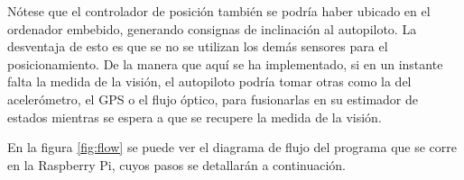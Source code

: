 Nótese que el controlador de posición también se podría haber ubicado en el ordenador embebido, generando consignas de inclinación al autopiloto. 
La desventaja de esto es que se no se utilizan los demás sensores para el posicionamiento.
De la manera que aquí se ha implementado, si en un instante falta la medida de la visión, el autopiloto podría tomar otras como la del acelerómetro, el GPS o el flujo óptico, para fusionarlas en su estimador de estados mientras se espera a que se recupere la medida de la visión.

En la figura \ref{fig:flow} se puede ver el diagrama de flujo del programa que se corre en la Raspberry Pi, cuyos pasos se detallarán a continuación.


\figFlow

